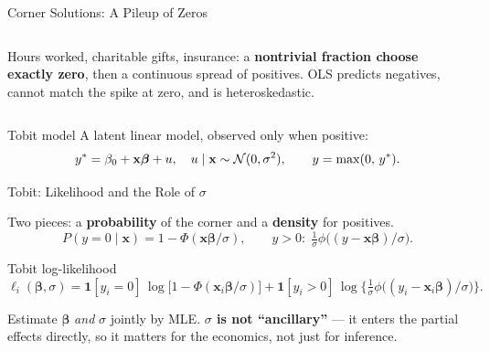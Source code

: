 \documentclass[aspectratio=169, 12pt]{beamer}
\newcommand{\xbeta}{\mathbf{x}\boldsymbol{\beta}}   %
\newcommand{\xib}{\mathbf{x}_i\boldsymbol{\beta}}    %
\begin{document}
\begin{frame}{Corner Solutions: A Pileup of Zeros}

  \begin{columns}[c]
    Hours worked, charitable gifts, insurance: a \textbf{nontrivial fraction
    choose exactly zero}, then a continuous spread of positives. OLS predicts
    negatives, cannot match the spike at zero, and is heteroskedastic.

    \centering
  \end{columns}

  \smallskip

  \begin{definitionbox}{Tobit model \citep{Tobin1958_estimation}}
    A latent linear model, observed only when positive:
    \[
      y^{*} = \beta_0 + \xbeta + u, \quad u\mid\mathbf{x}\sim \Normal(0,\sigma^2),
      \qquad y = \max(0,\, y^{*}).
    \]
  \end{definitionbox}

\end{frame}

\begin{frame}[shrink=8]{Tobit: Likelihood and the Role of $\sigma$}

  Two pieces: a \textbf{probability} of the corner and a \textbf{density} for positives.
  \[
    P(y=0\mid\mathbf{x}) = 1 - \Phi(\xbeta/\sigma), \qquad
    y>0:\; \tfrac{1}{\sigma}\phi\!\big((y-\xbeta)/\sigma\big).
  \]

  \begin{definitionbox}{Tobit log-likelihood}
    \[
      \ell_i(\boldsymbol\beta,\sigma)
       = \mathbf{1}[y_i=0]\,\log\!\big[1-\Phi(\xib/\sigma)\big]
       + \mathbf{1}[y_i>0]\,\log\!\Big\{\tfrac{1}{\sigma}\phi\big((y_i-\xib)/\sigma\big)\Big\}.
    \]
  \end{definitionbox}

  \smallskip

  \begin{keybox}
    Estimate $\boldsymbol\beta$ \emph{and} $\sigma$ jointly by MLE.
    \textbf{$\sigma$ is not ``ancillary''} --- it enters the partial effects
    directly, so it matters for the economics, not just for inference.
  \end{keybox}

\end{frame}
\end{document}
